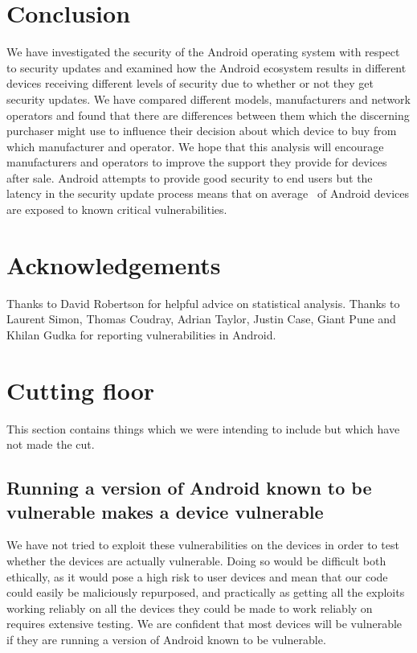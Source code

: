 \documentclass[conference,a4paper,twoside]{IEEEtran}
\let\OldTodo\todo
\renewcommand{\todo}{\OldTodo[inline]}
\begin{document}
\section{Conclusion}
\label{sec:conclusion}
We have investigated the security of the Android operating system with respect to security updates and examined how the Android ecosystem results in different devices receiving different levels of security due to whether or not they get security updates.
We have compared different models, manufacturers and network operators and found that there are differences between them which the discerning purchaser might use to influence their decision about which device to buy from which manufacturer and operator.
We hope that this analysis will encourage manufacturers and operators to improve the support they provide for devices after sale.
Android attempts to provide good security to end users but the latency in the security update process means that on average \daMeanInsecurityPerc\ of Android devices are exposed to known critical vulnerabilities.


\section*{Acknowledgements}
Thanks to David Robertson for helpful advice on statistical analysis.
Thanks to Laurent Simon, Thomas Coudray, Adrian Taylor, Justin Case, Giant Pune and Khilan Gudka for reporting vulnerabilities in Android.


\printbibliography


\listoftodos


\section{Cutting floor}

This section contains things which we were intending to include but which have not made the cut.

\subsection{Running a version of Android known to be vulnerable makes a device vulnerable}
We have not tried to exploit these vulnerabilities on the devices in order to test whether the devices are actually vulnerable.
Doing so would be difficult both ethically, as it would pose a high risk to user devices and mean that our code could easily be maliciously repurposed, and practically as getting all the exploits working reliably on all the devices they could be made to work reliably on requires extensive testing.
We are confident that most devices will be vulnerable if they are running a version of Android known to be vulnerable. \todo{WHY?}
\end{document}
